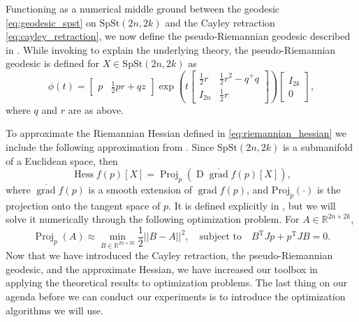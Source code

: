 Functioning as a numerical middle ground between the geodesic \eqref{eq:geodesic_spst} on $\mathrm{SpSt}(2n, 2k)$ and the Cayley retraction \eqref{eq:cayley_retraction}, we now define the pseudo-Riemannian geodesic described in \cite[p.~10]{BendokatZimmermann2021}. While invoking \cite{BendokatZimmermann2021} to explain the underlying theory, the pseudo-Riemannian geodesic is defined for $X\in \mathrm{SpSt}(2n, 2k)$ as 
%
\begin{equation*}
\phi(t)=\begin{bmatrix}
p & \frac{1}{2}pr+qz
\end{bmatrix}\exp\left( t\begin{bmatrix}
\frac{1}{2}r  & \frac{1}{2}r^{2}-q^{+}q \\
I_{2n} & \frac{1}{2}r
\end{bmatrix} \right)
\begin{bmatrix}
I_{2k} \\
0
\end{bmatrix},
\end{equation*}
%
where $q$ and $r$ are as above. 

To approximate the Riemannian Hessian defined in \eqref{eq:riemannian_hessian} we include the following approximation from \cite[Corr.~5.16]{Boumal2023}. Since $\mathrm{SpSt}(2n, 2k)$ is a submanifold of a Euclidean space, then
%
\begin{equation}\label{eq:approximate_hessian}
\operatorname{Hess}f(p)[X]=\operatorname{Proj}_{p}(\operatorname{D}\overline{\operatorname{grad}}f(p)[X]),
\end{equation}
%
where $\overline{\operatorname{grad}}f(p)$ is a smooth extension of $\operatorname{grad}f(p)$, and $\mathrm{Proj}_{p}(\cdot)$ is the projection onto the tangent space of $p$. It is defined explicitly in \cite[Lemma~2.3]{JensenZimmermann2024}, but we will solve it numerically through the following optimization problem. For $A\in \mathbb{R}^{2n\times 2k}$,
%
\begin{equation*}
\operatorname{Proj}_{p}(A)\approx \operatorname*{min}_{B\in \mathbb{R}^{2n\times2k}} \frac{1}{2}\lvert \lvert B-A \rvert  \rvert ^{2},\quad\text{subject to}\quad B^{\mathrm{T}}Jp+p^{\mathrm{T}}JB=0.
\end{equation*}
%
Now that we have introduced the Cayley retraction, the pseudo-Riemannian geodesic, and the approximate Hessian, we have increased our toolbox in applying the theoretical results to optimization problems. The last thing on our agenda before we can conduct our experiments is to introduce the optimization algorithms we will use. 